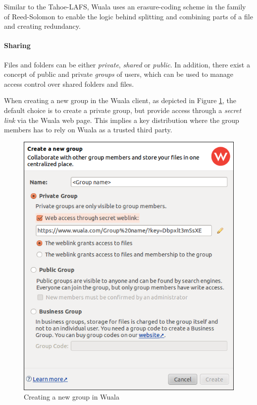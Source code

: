 \documentclass[pdftex,english,10pt,b5paper,twoside]{book}
\begin{document}
Similar to the Tahoe-\ac{LAFS}, Wuala uses an erasure-coding scheme in the
family of Reed-Solomon \cite{wuala} to enable the logic behind splitting and
combining parts of a file and creating redundancy.

\paragraph{Sharing} Files and folders can be either \emph{private},
\emph{shared} or \emph{public}. In addition, there exist a concept of public
and private \emph{groups} of users, which can be used to manage access control
over shared folders and files.

When creating a new group in the Wuala client, as depicted in Figure
\ref{fig:wuala:newgroup}, the default choice is to create a private group, but
provide access through a \emph{secret link} via the Wuala web page.
This implies a key distribution where the group members has to rely on Wuala as
a trusted third party.

\begin{figure}[h!]
    \centering
    \includegraphics[width=\columnwidth]{wuala_create_group.png}
    \caption{Creating a new group in Wuala}
    \label{fig:wuala:newgroup}
\end{figure}
\end{document}
